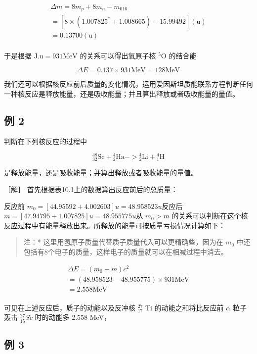 \[
\begin{array}{l} \Delta m = 8 m _ {p} + 8 m _ {n} - m _ {016} \\ = [ 8 \times (1.007825 ^ {*} + 1.008665) - 15.99492 ] (\mathrm{u}) \\ = 0.13700 (\mathrm{u}) \\ \end{array}
\]

于是根据 \(\mathrm{J.u} = 931\mathrm{MeV}\) 的关系可以得出氧原子核
\(^5\mathrm{O}\) 的结合能

\[
\Delta E = 0.137 \times 931 \mathrm{MeV} = 128 \mathrm{MeV}
\]

我们还可以根据核反应前后质量的变化情况，运用爱因斯坦质能联系方程判断任何一种核反应是释放能量，还是吸收能量；并且算出释放或者吸收能量的量值。

\subsection{例 2}

判断在下列核反应的过程中

\[
{ } _ { 32 } ^ { 48 } \mathrm{Sc} + { } _ { 2 } ^ { 4 } \mathrm{Ha} - > { } _ { 2 } ^ { 4 } \mathrm{Li} + { } _ { 1 } ^ { 4 } \mathrm{H}
\]

是释放能量，还是吸收能量；并算出释放或者吸收能量的量值。

［解］ 首先根据表10.1上的数据算出反应前后的总质量：

反应前 \(m_{0}=[44.95592+4.002603]u=48.958523u\)反应后
\(m = [47.94795 + 1.007825] u = 48.955775 u\)从 \(m_{0}>m\)
的关系可以判断在这个核反应过程中有能量释放出来。所释放的能量可按质量亏损情况计算如下：

\begin{quote}
注：* 这里用氢原子质量代替质子质量代入可以更精确些，因为在 \(m_{0}\)
中还包括有8个电子的质量，这样电子的质量就可以在相减过程中消去。
\end{quote}

\[
\begin{array}{l} \Delta E = (m _ {0} - m) c ^ {2} \\ = (48.958523 - 48.955775) \times 931 \mathrm{MeV} \\ = 2.558 \mathrm{MeV} \\ \end{array}
\]

可见在上述反应后，质子的动能以及反冲核 \(^{27}_{17}\) Ti
的动能之和将比反应前 \(\alpha\) 粒子轰击 \({}^{27}_{15}Sc\) 时的动能多
2.558 MeV，

\subsection{例 3}

